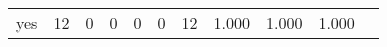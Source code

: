 \begin{longtable}{lp{1.10cm}p{1.10cm}p{1.10cm}p{1.10cm}p{1.10cm}p{1.10cm}p{1.10cm}p{1.10cm}p{1.10cm}p{1.10cm}}
yes       &                     12 &                                  0 &                                 0 &                                0 &                                 0 &                              12 &                          1.000 &                                 1.000 &                               1.000 \\
\end{longtable}
